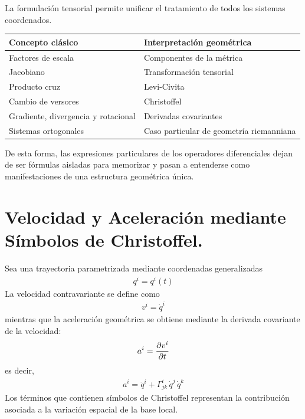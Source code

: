 \documentclass[12pt]{article}
\begin{document}
La formulación tensorial permite unificar el tratamiento de todos los sistemas coordenados.

\begin{center}
\begin{tabular}{ll}
\toprule
Concepto clásico & Interpretación geométrica \\
\midrule
Factores de escala & Componentes de la métrica \\
Jacobiano & Transformación tensorial \\
Producto cruz & Levi-Civita \\
Cambio de versores & Christoffel \\
Gradiente, divergencia y rotacional & Derivadas covariantes \\
Sistemas ortogonales & Caso particular de geometría riemanniana \\
\bottomrule
\end{tabular}
\end{center}

De esta forma, las expresiones particulares de los operadores diferenciales dejan de ser fórmulas aisladas para memorizar y pasan a entenderse como manifestaciones de una estructura geométrica única.


\section{Velocidad y Aceleración mediante Símbolos de Christoffel.}

Sea una trayectoria parametrizada mediante coordenadas generalizadas
\begin{align*}
    q^{i} = q^{i} (t)
\end{align*}
La velocidad contravariante se define como
\begin{align*}
    v^{i} = \dot{q}^{i}
\end{align*}
mientras que la aceleración geométrica se obtiene mediante la derivada covariante de la velocidad:
\begin{align*}
    a^{i} = \pdv{v^{i}}{t}
\end{align*}
es decir,
\begin{align*}
    \boxed{
        a^{i} = \ddot{q}^{i} + \Gamma_{jk}^{i} \, \dot{q}^{j} \, \dot{q}^{k}
    }
\end{align*}
Los términos que contienen símbolos de Christoffel representan la contribución asociada a la variación espacial de la base local.

\end{document}
